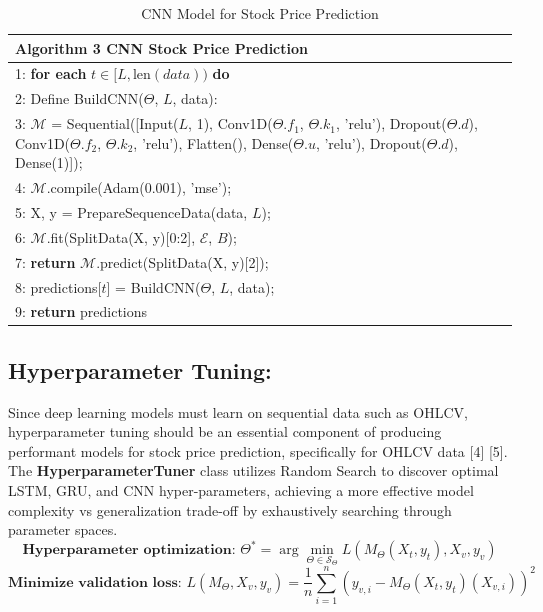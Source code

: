 \begin{itemize}
    \begin{table}[h]
    \tiny
    \centering
    \begin{tabular}{|p{10cm}|}
    \hline
    \textbf{Algorithm 3 CNN Stock Price Prediction} \\
    \hline
    1: \textbf{for each} $t \in [L, \text{len}(data))$ \textbf{do} \\
    2: \quad Define BuildCNN($\Theta$, $L$, data): \\
    3: \quad\quad $\mathcal{M}$ = Sequential([Input($L$, 1), Conv1D($\Theta.f_1$, $\Theta.k_1$, 'relu'), Dropout($\Theta.d$), Conv1D($\Theta.f_2$, $\Theta.k_2$, 'relu'), Flatten(), Dense($\Theta.u$, 'relu'), Dropout($\Theta.d$), Dense(1)]); \\
    4: \quad\quad $\mathcal{M}$.compile(Adam(0.001), 'mse'); \\
    5: \quad\quad X, y = PrepareSequenceData(data, $L$); \\
    6: \quad\quad $\mathcal{M}$.fit(SplitData(X, y)[0:2], $\mathcal{E}$, $B$); \\
    7: \quad\quad \textbf{return} $\mathcal{M}$.predict(SplitData(X, y)[2]); \\
    8: \quad predictions[$t$] = BuildCNN($\Theta$, $L$, data); \\
    9: \textbf{return} predictions \\
    \hline
    \end{tabular}
    \caption{CNN Model for Stock Price Prediction}
    \label{tab:cnn_predictor}
    \end{table}

\end{itemize}

\subsection{Hyperparameter Tuning: } Since deep learning models must learn on sequential data such as OHLCV, hyperparameter tuning should be an essential component of producing performant models for stock price prediction, specifically for OHLCV data [4] [5]. The \textbf{HyperparameterTuner} class utilizes Random Search to discover optimal LSTM, GRU, and CNN hyper-parameters, achieving a more effective model complexity vs generalization trade-off by exhaustively searching through parameter spaces.
\begin{equation}
\textbf{Hyperparameter optimization: } \Theta^* = \arg\min_{\Theta \in \mathcal{S}_\Theta} L(M_\Theta(X_t, y_t), X_v, y_v)
\end{equation}
\begin{equation}
\textbf{Minimize validation loss: } L(M_\Theta, X_v, y_v) = \frac{1}{n} \sum_{i=1}^{n} (y_{v,i} - M_\Theta(X_t, y_t)(X_{v,i}))^2
\end{equation}

